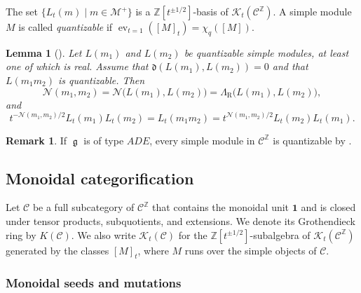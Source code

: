\documentclass[12pt, reqno]{amsart}
\theoremstyle{plain}
\newtheorem{lemma}[theorem]{Lemma}
\theoremstyle{definition}
\newtheorem{remark}[theorem]{Remark}
\numberwithin{equation}{section}
\newcommand{\ZZ}{\mathbb{Z}}
\newcommand{\fg}{\operatorname{\mathfrak{g}}}
\newcommand{\LambdaR}{\Lambda_{\mathrm R}}
\begin{document}
The set \(\{L_t(m)\mid m\in\mathcal M^+\}\) is a
\(\ZZ[t^{\pm1/2}]\)-basis of \(\mathcal{K}_t(\mathscr C^{\ZZ})\). A simple module
\(M\) is called \emph{quantizable} if
\(\operatorname{ev}_{t=1}([M]_t)=\chi_q([M])\).

\begin{lemma}[{\cite[Lemma~6.8]{kashiwara2025monoidal}}]\label{lem:Nm1m2}
    Let \(L(m_1)\) and \(L(m_2)\) be quantizable simple modules, at least
    one of which is real. Assume that
    \(\mathfrak d(L(m_1),L(m_2))=0\) and that \(L(m_1m_2)\) is
    quantizable. Then
    \begin{equation}\label{eq:N-equals-Lambda}
        \mathcal N(m_1,m_2)
        =\mathcal N\bigl(L(m_1),L(m_2)\bigr)
        =\LambdaR\bigl(L(m_1),L(m_2)\bigr),
    \end{equation}
    and
    \begin{equation}\label{eq:quantum-character-commuting-product}
        t^{-\mathcal N(m_1,m_2)/2}L_t(m_1)L_t(m_2)
        =L_t(m_1m_2)
        =t^{\mathcal N(m_1,m_2)/2}L_t(m_2)L_t(m_1).
    \end{equation}
\end{lemma}

\begin{remark}\label{rem:quantizable}
    If \(\fg\) is of type \(ADE\), every simple module in
    \(\mathscr C^{\ZZ}\) is quantizable by
    \cite{nakajima2004quiver}.
\end{remark}

\subsection{Monoidal categorification}

Let \(\mathscr C\) be a full subcategory of \(\mathscr C^{\ZZ}\) that
contains the monoidal unit \(\mathbf1\) and is closed under tensor products,
subquotients, and extensions. We denote its Grothendieck ring by
\(K(\mathscr C)\). We also write \(\mathcal{K}_t(\mathscr C)\) for the
\(\ZZ[t^{\pm1/2}]\)-subalgebra of \(\mathcal{K}_t(\mathscr C^{\ZZ})\) generated by
the classes \([M]_t\), where \(M\) runs over the simple objects of
\(\mathscr C\).

\subsubsection{Monoidal seeds and mutations}
\end{document}
